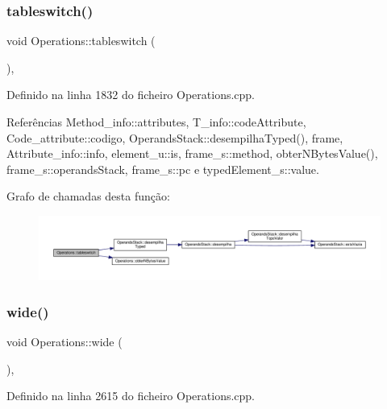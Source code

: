 \subsubsection{\texorpdfstring{tableswitch()}{tableswitch()}}
{\footnotesize\ttfamily void Operations\+::tableswitch (\begin{DoxyParamCaption}{ }\end{DoxyParamCaption})\hspace{0.3cm}{\ttfamily [static]}, {\ttfamily [private]}}



Definido na linha 1832 do ficheiro Operations.\+cpp.



Referências Method\+\_\+info\+::attributes, T\+\_\+info\+::code\+Attribute, Code\+\_\+attribute\+::codigo, Operands\+Stack\+::desempilha\+Typed(), frame, Attribute\+\_\+info\+::info, element\+\_\+u\+::is, frame\+\_\+s\+::method, obter\+N\+Bytes\+Value(), frame\+\_\+s\+::operands\+Stack, frame\+\_\+s\+::pc e typed\+Element\+\_\+s\+::value.

Grafo de chamadas desta função\+:
\nopagebreak
\begin{figure}[H]
\begin{center}
\leavevmode
\includegraphics[width=350pt]{classOperations_a72955f43cde98b73c503e1a8c1505352_cgraph}
\end{center}
\end{figure}
\mbox{\label{classOperations_ab1474dfc4eb5142361b00d185f0a4a2b}} 
\subsubsection{\texorpdfstring{wide()}{wide()}}
{\footnotesize\ttfamily void Operations\+::wide (\begin{DoxyParamCaption}{ }\end{DoxyParamCaption})\hspace{0.3cm}{\ttfamily [static]}, {\ttfamily [private]}}



Definido na linha 2615 do ficheiro Operations.\+cpp.



